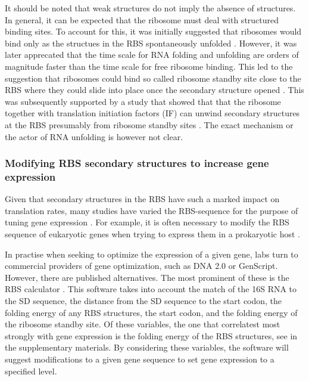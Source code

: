 It should be noted that weak structures do not imply the absence of structures.
In general, it can be expected that the ribosome must deal with structured
binding sites. To account for this, it was initially suggested that ribosomes
would bind only as the structues in the RBS spontaneously unfolded
\cite{de_smit_translational_1994}. However, it was later apprecated that the
time scale for RNA folding and unfolding are orders of magnitude faster than
the time scale for free ribosome binding. This led to the suggestion that
ribosomes could bind so called ribosome standby site close to the RBS where
they could slide into place once the secondary structure opened
\cite{de_smit_translational_2003-1}. This was subsequently supported by a study
that showed that that the ribosome together with translation initiation factors
(IF) can unwind secondary structures at the RBS presumably from ribosome
standby sites \cite{studer_unfolding_2006}. The exact mechanism or the actor of
RNA unfolding is however not clear.

\subsubsection{Modifying RBS secondary structures to increase gene expression}
Given that secondary structures in the RBS have such a marked impact on
translation rates, many studies have varied the RBS-sequence for the purpose of
tuning gene expression \cite{cebe_rapid_2006} \cite{park_design_2007}
\cite{berg_expression_2009}. For example, it is often necessary to modify the
RBS sequence of eukaryotic genes when trying to express them in a prokaryotic
host \cite{care_translation_2007}.

In practise when seeking to optimize the expression of a given gene, labs turn
to commercial providers of gene optimization, such as DNA 2.0 or GenScript.
However, there are published alternatives. The most prominent of these is the
RBS calculator \cite{salis_automated_2009}. This software takes into account
the match of the 16S RNA to the SD sequence, the distance from the SD sequence
to the start codon, the folding energy of any RBS structures, the start codon,
and the folding energy of the ribosome standby site. Of these variables, the
one that correlatest most strongly with gene expression is the folding energy
of the RBS structures, see \cite{salis_automated_2009} in the supplementary
materials. By considering these variables, the software will suggest
modifications to a given gene sequence to set gene expression to a specified
level.

